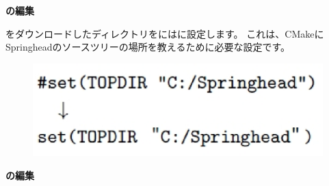 \bigskip
\noindent
\bf{\CMakeTopdir{}}の編集
\begin{narrow}[20pt]
	\SprLib をダウンロードしたディレクトリを\CMakeTopdir{}には\SprLib に設定します。
	これは、CMakeにSpringheadのソースツリーの場所を教えるために必要な設定です。

\ifLwarp
	\begin{figure}[h]
	    \begin{center}
	    \includegraphics[width=\textwidth]{fig/command-3-1-b.eps}
	    \end{center}
	    \label{fig:DownloadTree}
	\end{figure}
\else
	\begin{narrow}[15pt]
	\end{narrow}
\fi
\end{narrow}
\medskip
\noindent
\bf{\CMakeSettings{}}の編集
